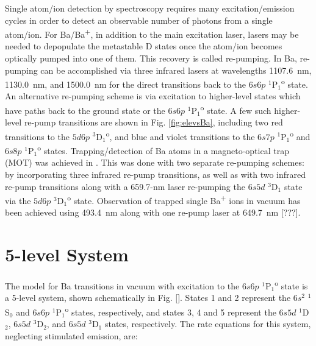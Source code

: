 

Single atom/ion detection by spectroscopy requires many excitation/emission cycles in order to detect an observable number of photons from a single atom/ion.  For Ba/Ba\textsuperscript{+}, in addition to the main excitation laser, lasers may be needed to depopulate the metastable D states once the atom/ion becomes optically pumped into one of them.  This recovery is called re-pumping.  In Ba, re-pumping can be accomplished via three infrared lasers at wavelengths 1107.6~nm, 1130.0~nm, and 1500.0~nm for the direct transitions back to the $6s6p$ $^{1}$P$_{1}$\textsuperscript{o} state.  An alternative re-pumping scheme is via excitation to higher-level states which have paths back to the ground state or the $6s6p$ $^{1}$P$_{1}$\textsuperscript{o} state.  A few such higher-level re-pump transitions are shown in Fig. \ref{fig:elevsBa}, including two red transitions to the $5d6p$ $^{3}$D$_{1}$\textsuperscript{o}, and blue and violet transitions to the $6s7p$ $^{1}$P$_{1}$\textsuperscript{o} and $6s8p$ $^{1}$P$_{1}$\textsuperscript{o} states.  Trapping/detection of Ba atoms in a magneto-optical trap (MOT) was achieved in \cite{BaMOT}.  This was done with two separate re-pumping schemes:  by incorporating three infrared re-pump transitions, as well as with two infrared re-pump transitions along with a 659.7-nm laser re-pumping the $6s5d$ $^{3}$D$_{1}$ state via the $5d6p$ $^{3}$D$_{1}$\textsuperscript{o} state.  Observation of trapped single Ba\textsuperscript{+} ions in vacuum has been achieved using 493.4~nm along with one re-pump laser at 649.7~nm {\color{red}[???]}\cite{singleBaPlusEXO}.


\section{5-level System}
\label{sec:model}

The model for Ba transitions in vacuum with excitation to the $6s6p$ $^{1}$P$_{1}$\textsuperscript{o} state is a 5-level system, shown schematically in Fig. [].  States 1 and 2 represent the $6s^{2}$ $^{1}$S$_{0}$ and $6s6p$ $^{1}$P$_{1}$\textsuperscript{o} states, respectively, and states 3, 4 and 5 represent the $6s5d$ $^{1}$D$_{2}$, $6s5d$ $^{3}$D$_{2}$, and $6s5d$ $^{3}$D$_{1}$ states, respectively.  The rate equations for this system, neglecting stimulated emission, are:

